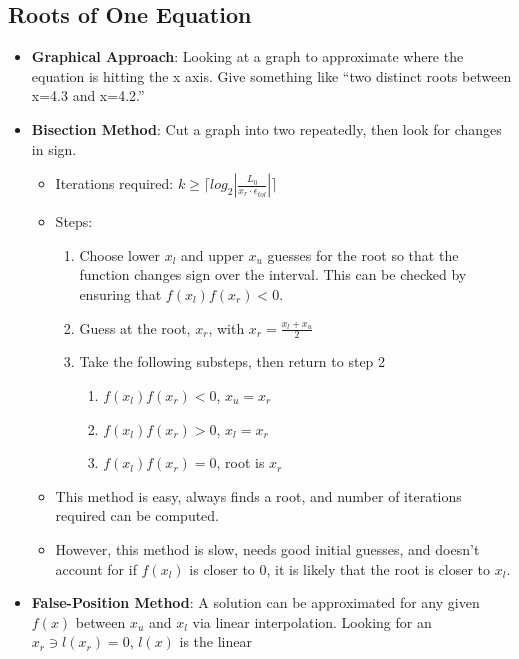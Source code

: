 \documentclass[fontsize=9pt]{scrartcl}
\begin{document}
\begin{multicols}{3}
    \subsection{Roots of One Equation}
      \begin{itemize}
       \item \textbf{Graphical Approach}: Looking at a graph to approximate where the equation is hitting the x axis. Give 
          something like ``two distinct roots between x=4.3 and x=4.2.''
       \item \textbf{Bisection Method}: Cut a graph into two repeatedly, then look for changes in sign.
        \begin{itemize}
          \item Iterations required: $k \geq \lceil log_2|\frac{L_0}{x_r \cdot \epsilon_{tol}}|\rceil$
          \item Steps:
          \begin{enumerate}
              \item Choose lower $x_l$ and upper $x_u$ guesses for the root so that the function changes sign over the
              interval. This can be checked by ensuring that $f(x_l)f(x_r) < 0$.
              \item Guess at the root, $x_r$, with $x_r = \frac{x_l + x_u}{2}$
              \item Take the following substeps, then return to step 2
              \begin{enumerate}
                \item $f(x_l)f(x_r) < 0$, $x_u = x_r$
                \item $f(x_l)f(x_r) > 0$, $x_l = x_r$
                \item $f(x_l)f(x_r) = 0$, root is $x_r$
              \end{enumerate}
          \end{enumerate}
          \item This method is easy, always finds a root, and number of iterations required can be computed.
          \item However, this method is slow, needs good initial guesses, and doesn't account for if $f(x_l)$
            is closer to 0, it is likely that the root is closer to $x_l$.
        \end{itemize}
        \item \textbf{False-Position Method}: A solution can be approximated for any given $f(x)$ between $x_u$
          and $x_l$ via linear interpolation. Looking for an $x_r \ni l(x_r) = 0$, $l(x)$ is the linear

\end{itemize}
\end{multicols}
\end{document}
